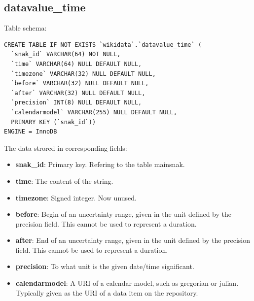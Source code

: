 \documentclass[12pt]{article}
\begin{document}
\subsection{datavalue\_time}
\lstset{language=SQL}
Table schema:
\begin{lstlisting}
CREATE TABLE IF NOT EXISTS `wikidata`.`datavalue_time` (
  `snak_id` VARCHAR(64) NOT NULL,
  `time` VARCHAR(64) NULL DEFAULT NULL,
  `timezone` VARCHAR(32) NULL DEFAULT NULL,
  `before` VARCHAR(32) NULL DEFAULT NULL,
  `after` VARCHAR(32) NULL DEFAULT NULL,
  `precision` INT(8) NULL DEFAULT NULL,
  `calendarmodel` VARCHAR(255) NULL DEFAULT NULL,
  PRIMARY KEY (`snak_id`))
ENGINE = InnoDB
\end{lstlisting}
The data strored in corresponding fields:
\begin{itemize}
\item \textbf{snak\_id}: Primary key. Refering to the table mainsnak.
\item \textbf{time}: The content of the string.
\item \textbf{timezone}: Signed integer. Now unused.
\item \textbf{before}: Begin of an uncertainty range, given in the unit defined by the precision field. This cannot be used to represent a duration.
\item \textbf{after}: End of an uncertainty range, given in the unit defined by the precision field. This cannot be used to represent a duration.
\item \textbf{precision}: To what unit is the given date/time significant.
\item \textbf{calendarmodel}: A URI of a calendar model, such as gregorian or julian. Typically given as the URI of a data item on the repository.
\end{itemize}
\end{document}
